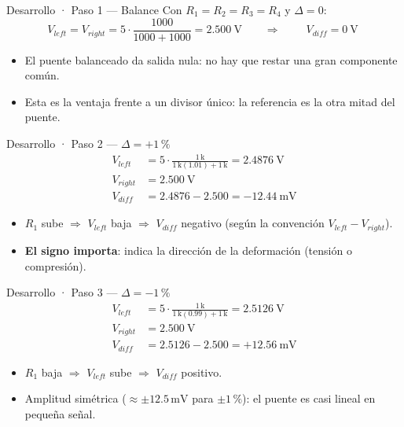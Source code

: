 \documentclass[aspectratio=169]{beamer}
\begin{document}
\begin{frame}{Desarrollo · Paso 1 — Balance}
  Con $R_1=R_2=R_3=R_4$ y $\Delta = 0$:
  \[
    V_{left} = V_{right} = 5\cdot\frac{1000}{1000+1000} = \SI{2.500}{\volt}
    \qquad\Longrightarrow\qquad
    \boxed{\;V_{diff} = 0\ \text{V}\;}
  \]
  \pause
  \begin{itemize}
    \item El puente balanceado da salida nula: no hay que restar una gran componente común.
    \item Esta es la ventaja frente a un divisor único: la referencia es la otra mitad del puente.
  \end{itemize}
\end{frame}

\begin{frame}{Desarrollo · Paso 2 — $\Delta = +1\,\text{\%}$}
  \begin{align*}
    V_{left} &= 5\cdot\frac{1\,\text{k}}{1\,\text{k}(1.01)+1\,\text{k}} = \SI{2.4876}{\volt}\\
    V_{right} &= \SI{2.500}{\volt}\\
    V_{diff} &= 2.4876 - 2.500 = -\SI{12.44}{\milli\volt}
  \end{align*}
  \pause
  \begin{itemize}
    \item $R_1$ sube $\Rightarrow$ $V_{left}$ baja $\Rightarrow$ $V_{diff}$ negativo (según la convención $V_{left}-V_{right}$).
    \item \textbf{El signo importa}: indica la dirección de la deformación (tensión o compresión).
  \end{itemize}
\end{frame}

\begin{frame}{Desarrollo · Paso 3 — $\Delta = -1\,\text{\%}$}
  \begin{align*}
    V_{left} &= 5\cdot\frac{1\,\text{k}}{1\,\text{k}(0.99)+1\,\text{k}} = \SI{2.5126}{\volt}\\
    V_{right} &= \SI{2.500}{\volt}\\
    V_{diff} &= 2.5126 - 2.500 = +\SI{12.56}{\milli\volt}
  \end{align*}
  \pause
  \begin{itemize}
    \item $R_1$ baja $\Rightarrow$ $V_{left}$ sube $\Rightarrow$ $V_{diff}$ positivo.
    \item Amplitud simétrica ($\approx \pm 12.5\,\text{mV}$ para $\pm 1\,\text{\%}$): el puente es casi lineal en pequeña señal.
  \end{itemize}
\end{frame}
\end{document}
